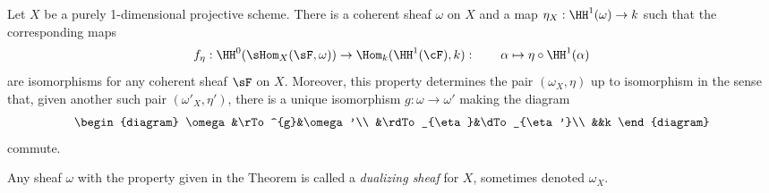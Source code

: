 \begin{theorem}
Let $X$ be a purely 1-dimensional projective scheme. There is a coherent sheaf
$\omega$ on $X$ and a map $\eta_{X}: \HH^{1}(\omega) \to k$ such that
the corresponding maps
$$
f_{\eta}: \HH^{0}(\sHom_{X}(\sF, \omega))
\to
\Hom_{k}(\HH^{1}(\cF), k): \qquad \alpha \mapsto \eta\circ \HH^{1}(\alpha)
$$
are isomorphisms for any coherent sheaf $\sF$ on $X$. Moreover, this property determines the pair $(\omega_{X}, \eta)$ up to isomorphism in the sense that, given another such pair
$(\omega'_{X}, \eta')$,  there is a unique isomorphism $g: \omega\to \omega'$ making the diagram
$$
\begin{diagram}
 \omega&\rTo^{g}&\omega'\\
 &\rdTo_{\eta}&\dTo_{\eta'}\\
 &&k
\end{diagram}
$$
commute. 
\end{theorem}

Any  sheaf $\omega$ with the property given in the Theorem is called a \emph{dualizing sheaf} for $X$, sometimes denoted $\omega_{X}$.

